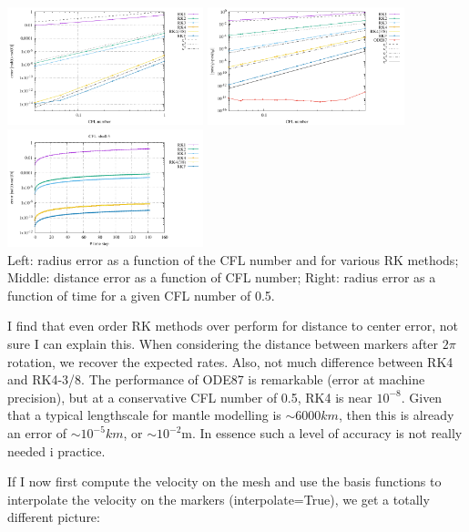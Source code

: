 \begin{center}
\includegraphics[width=5.7cm]{python_codes/fieldstone_122/results/exp1/errors.pdf}
\includegraphics[width=5.7cm]{python_codes/fieldstone_122/results/exp1/errors2.pdf}
\includegraphics[width=5.7cm]{python_codes/fieldstone_122/results/exp1/rad.pdf}\\
{\captionfont Left: radius error as a function of the CFL number and for various RK methods;
Middle: distance error as a function of CFL number; 
Right: radius error as a function of time for a given CFL number of 0.5.}
\end{center}

I find that even order RK methods over perform for distance to center error, not sure I can 
explain this. When considering the distance between markers after $2\pi$ rotation, we recover the 
expected rates. Also, not much difference between RK4 and RK4-3/8.
The performance of ODE87 is remarkable (error at machine precision), but at a conservative 
CFL number of 0.5, RK4 is near $10^{-8}$. Given that a typical lengthscale for mantle modelling 
is $\sim 6000km$, then this is already an error of $\sim 10^{-5}km$, or $\sim 10^{-2}$m. 
In essence such a level of accuracy is not really needed i practice.

If I now first compute the velocity on the mesh and use the basis functions to interpolate the 
velocity on the markers ({\python interpolate}=True), we get a totally different picture:

